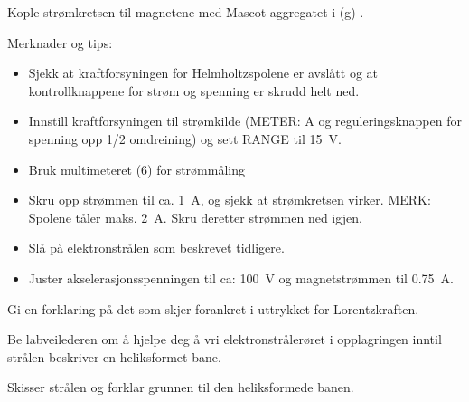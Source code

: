 \documentclass[../Elmag-labhefte-2020.tex]{subfiles}
\begin{document}
{\itsf Kople strømkretsen til magnetene med Mascot aggregatet i (g)
.}


Merknader og tips:
\vspace{-4mm} 
\begin{itemize}
    \item Sjekk at kraftforsyningen for Helmholtzspolene er avslått og at kontroll\-knappene for strøm og spenning er skrudd helt ned.
    \item Innstill kraftforsyningen til strømkilde (METER: A og reguleringsknappen for spenning opp 1/2 omdreining) og sett RANGE til \SI{15}{\volt}.
    \item Bruk multimeteret (6) for strømmåling
    \item Skru opp strømmen til ca. \SI{1}{\ampere}, og sjekk at strømkretsen virker. MERK: Spolene tåler maks. \SI{2}{\ampere}. Skru deretter strømmen ned igjen.
    \item Slå på elektronstrålen som beskrevet tidligere.
    \item Juster akselerasjonsspenningen til ca: \SI{100}{\volt} og magnetstrømmen til \SI{0,75}{\ampere}.
\end{itemize}

{\itsf Gi en forklaring på det som skjer forankret i uttrykket for Lorentzkraften. }

Be labveilederen om å hjelpe deg å vri elektronstrålerøret i opplagringen inntil strålen beskriver en heliksformet bane.

{\itsf Skisser strålen og forklar grunnen til den heliksformede banen.}
\end{document}
